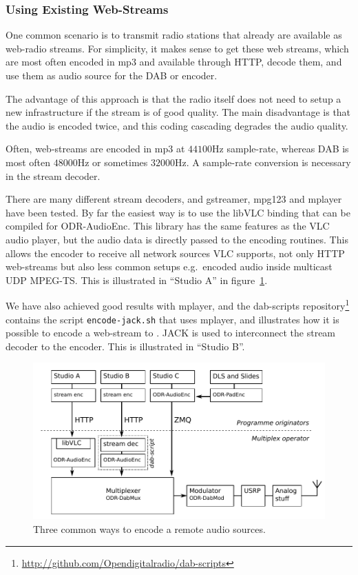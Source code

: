 
\subsubsection{Using Existing Web-Streams}
\label{usingexistingwebstreams}
One common scenario is to transmit radio stations that already are available as
web-radio streams. For simplicity, it makes sense to get these web streams,
which are most often encoded in mp3 and available through HTTP, decode them, and
use them as audio source for the DAB or \dabplus encoder.

The advantage of this approach is that the radio itself does not need to setup a
new infrastructure if the stream is of good quality. The main disadvantage is
that the audio is encoded twice, and this coding cascading degrades the audio
quality.

Often, web-streams are encoded in mp3 at $44100$Hz sample-rate, whereas DAB
is most often $48000$Hz or sometimes $32000$Hz. A sample-rate conversion is
necessary in the stream decoder.

There are many different stream decoders, and gstreamer, mpg123 and mplayer have
been tested. By far the easiest way is to use the libVLC binding that can be
compiled for ODR-AudioEnc. This library has
the same features as the VLC audio player, but the audio data is directly passed
to the encoding routines. This allows the encoder to receive all network
sources VLC supports, not only HTTP web-streams but also less common setups
e.g.\ encoded audio inside multicast UDP MPEG-TS.
This is illustrated in ``Studio A'' in figure~\ref{fig:txchain-with-encoders}.

We have also achieved good results with mplayer, and the dab-scripts
repository\footnote{\url{http://github.com/Opendigitalradio/dab-scripts}}
contains the script \texttt{encode-jack.sh} that uses mplayer, and illustrates
how it is possible to encode a web-stream to \dabplus. JACK is used to
interconnect the stream decoder to the \dabplus encoder.
This is illustrated in ``Studio B''.

\begin{figure}[h]
    \includegraphics[width=\textwidth]{figures/txchain-with-encoders.pdf}
    \caption{Three common ways to encode a remote audio sources.}
    \label{fig:txchain-with-encoders}
\end{figure}


